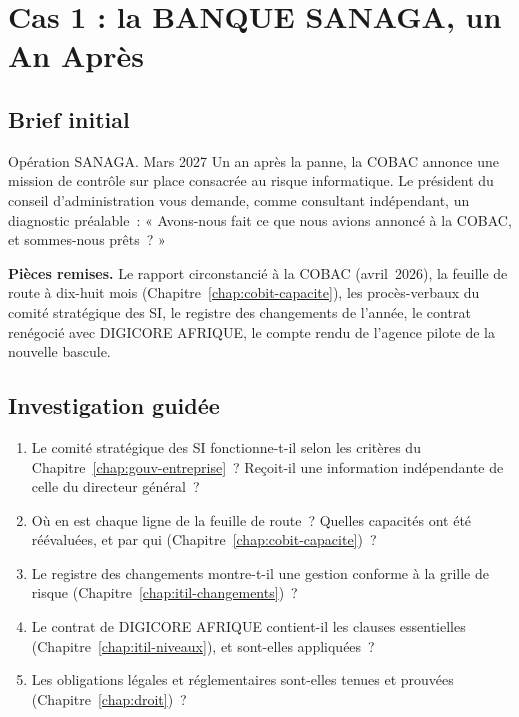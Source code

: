 \section{Cas 1 : la BANQUE SANAGA, un An Après}
\label{sec:c17-sanaga}

\subsection{Brief initial}

\begin{boxscenario}{Opération SANAGA. Mars 2027}
Un an après la panne, la COBAC annonce une mission de contrôle sur place
consacrée au risque informatique. Le président du conseil
d'administration vous demande, comme consultant indépendant, un
diagnostic préalable~: « Avons-nous fait ce que nous avions annoncé à la
COBAC, et sommes-nous prêts~? »

\medskip
\textbf{Pièces remises.} Le rapport circonstancié à la COBAC (avril~2026),
la feuille de route à dix-huit mois (Chapitre~\ref{chap:cobit-capacite}),
les procès-verbaux du comité stratégique des SI, le registre des
changements de l'année, le contrat renégocié avec DIGICORE AFRIQUE, le
compte rendu de l'agence pilote de la nouvelle bascule.
\end{boxscenario}

\subsection{Investigation guidée}

\begin{enumerate}
    \item Le comité stratégique des SI fonctionne-t-il selon les critères du
          Chapitre~\ref{chap:gouv-entreprise}~? Reçoit-il une information
          indépendante de celle du directeur général~?
    \item Où en est chaque ligne de la feuille de route~? Quelles capacités
          ont été réévaluées, et par qui (Chapitre~\ref{chap:cobit-capacite})~?
    \item Le registre des changements montre-t-il une gestion conforme à la
          grille de risque (Chapitre~\ref{chap:itil-changements})~?
    \item Le contrat de DIGICORE AFRIQUE contient-il les clauses essentielles
          (Chapitre~\ref{chap:itil-niveaux}), et sont-elles appliquées~?
    \item Les obligations légales et réglementaires sont-elles tenues et
          prouvées (Chapitre~\ref{chap:droit})~?
\end{enumerate}

